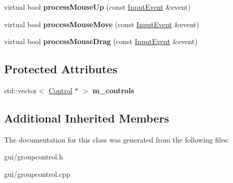 \begin{DoxyCompactItemize}
\item 
virtual bool {\bfseries process\+Mouse\+Up} (const \hyperlink{structInputEvent}{Input\+Event} \&event)\hypertarget{classGroupControl_a9d2e6a07fd2883bf4a24b33e57348490}{}\label{classGroupControl_a9d2e6a07fd2883bf4a24b33e57348490}

\item 
virtual bool {\bfseries process\+Mouse\+Move} (const \hyperlink{structInputEvent}{Input\+Event} \&event)\hypertarget{classGroupControl_abc5da944a795f30f1655fbe923bc9a13}{}\label{classGroupControl_abc5da944a795f30f1655fbe923bc9a13}

\item 
virtual bool {\bfseries process\+Mouse\+Drag} (const \hyperlink{structInputEvent}{Input\+Event} \&event)\hypertarget{classGroupControl_a43052cd235e03eed9bb8c981a93f7634}{}\label{classGroupControl_a43052cd235e03eed9bb8c981a93f7634}

\end{DoxyCompactItemize}
\subsection*{Protected Attributes}
\begin{DoxyCompactItemize}
\item 
std\+::vector$<$ \hyperlink{classControl}{Control} $\ast$ $>$ {\bfseries m\+\_\+controls}\hypertarget{classGroupControl_abeca9ed2512f47c8bc08f4a6c6cb1653}{}\label{classGroupControl_abeca9ed2512f47c8bc08f4a6c6cb1653}

\end{DoxyCompactItemize}
\subsection*{Additional Inherited Members}


The documentation for this class was generated from the following files\+:\begin{DoxyCompactItemize}
\item 
gui/groupcontrol.\+h\item 
gui/groupcontrol.\+cpp\end{DoxyCompactItemize}
